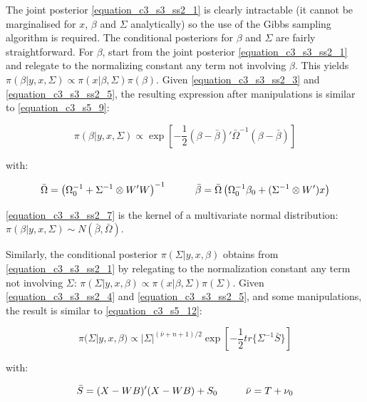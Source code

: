 The joint posterior \ref{equation_c3_s3_ss2_1} is clearly intractable (it cannot be marginalised for $x$, $\beta$ and $\Sigma$ analytically) so the use of the Gibbs sampling algorithm is required. The conditional posteriors for $\beta$ and $\Sigma$ are fairly straightforward. For $\beta$, start from the joint posterior \ref{equation_c3_s3_ss2_1} and relegate to the normalizing constant any term not involving $\beta$. This yields $\pi(\beta| y, x, \Sigma) \propto \pi(x|\beta, \Sigma) \pi(\beta)$. Given \ref{equation_c3_s3_ss2_3} and \ref{equation_c3_s3_ss2_5}, the resulting expression after manipulations is similar to \ref{equation_c3_s5_9}:

\begin{equation}
\pi(\beta| y, x, \Sigma) \propto \exp \left[ -\frac{1}{2} (\beta - \bar{\beta})' \bar{\Omega}^{-1} (\beta - \bar{\beta}) \right]
\label{equation_c3_s3_ss2_7}
\end{equation}

with:

\begin{equation}
\bar{\Omega} = \left( \Omega_0^{-1} + \Sigma^{-1} \otimes W'W \right)^{-1} \hspace{10mm}
\bar{\beta} = \bar{\Omega} \left(\Omega_0^{-1} \beta_0 + (\Sigma^{-1} \otimes W') x \right)
\label{equation_c3_s3_ss2_8}
\end{equation}

\ref{equation_c3_s3_ss2_7} is the kernel of a multivariate normal distribution: $\pi(\beta| y, x, \Sigma) \sim N(\bar{\beta}, \bar{\Omega})$.

Similarly, the conditional posterior $\pi(\Sigma| y, x, \beta)$ obtains from \ref{equation_c3_s3_ss2_1} by relegating to the normalization constant any term not involving $\Sigma$: $\pi(\Sigma|y, x, \beta) \propto \pi(x|\beta, \Sigma) \pi(\Sigma)$. Given \ref{equation_c3_s3_ss2_4} and \ref{equation_c3_s3_ss2_5}, and some manipulations, the result is similar to \ref{equation_c3_s5_12}:

\begin{equation}
\pi(\Sigma| y, x, \beta) \propto |\Sigma|^{(\bar{\nu} + n + 1)/2} \exp \left[ -\frac{1}{2} tr \{ \Sigma^{-1} \bar{S} \} \right]
\label{equation_c3_s3_ss2_9}
\end{equation}

with:

\begin{equation}
\bar{S} = (X - WB)'(X - WB) + S_0 \hspace{10mm} \bar{\nu} = T + \nu_0
\label{equation_c3_s3_ss2_10}
\end{equation}

